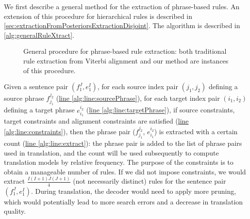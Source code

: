 We first describe a general method for the extraction of phrase-based rules.
An extension of this procedure for
hierarchical rules is described in
\autoref{sec:extractionFromPosteriorsExtractionDisjoint}. The algorithm is
described in \autoref{alg:generalRuleXtract}.
%
\begin{figure}
  \begin{algorithmic}[1]
       \hypertarget{alg:line:sourcePhrase}{} \label{alg:line:sourcePhrase}
         \hypertarget{alg:line:targetPhrase}{} \label{alg:line:targetPhrase}
          \hypertarget{alg:line:constraints}{} \label{alg:line:constraints}
             \hypertarget{alg:line:extract}{} \label{alg:line:extract}
          \EndIf
        \EndFor
      \EndFor
    \EndFunction
  \end{algorithmic}
  \caption{General procedure for phrase-based rule extraction: both traditional
    rule extraction from Viterbi alignment and our method are instances of this
    procedure.}
  \label{alg:generalRuleXtract}
\end{figure}
%
Given a
sentence pair $(f_1^J, e_1^I)$, for each source index pair $(j_1, j_2)$
defining a source phrase $f_{j_1}^{j_2}$
(\hyperlink{alg:line:sourcePhrase}{line \ref{alg:line:sourcePhrase}}), for each
target index pair $(i_1, i_2)$ defining a target phrase $e_{i_1}^{i_2}$
(\hyperlink{alg:line:targetPhrase}{line \ref{alg:line:targetPhrase}}), if source
constraints, target constraints and
alignment constraints are satisfied
(\hyperlink{alg:line:constraints}{line \ref{alg:line:constraints}}), then the
phrase pair ($f_{j_1}^{j_2}$, $e_{i_1}^{i_2}$) is extracted with a certain
count (\hyperlink{alg:line:extract}{line \ref{alg:line:extract}}): the phrase
pair is added to the list of phrase pairs used in translation, and the count
will be used subsequently to compute translation models by relative frequency.
The purpose
of the constraints is to obtain a manageable number of rules. If we did not
impose constraints, we would extract $\frac{I (I + 1) J (J + 1)}{4}$ (not necessarily distinct) rules
for the sentence pair $(f_1^J, e_1^I)$. During
translation, the decoder would need to apply more pruning, which would
potentially lead to more search errors and a decrease in translation
quality.

